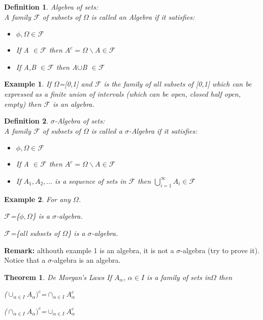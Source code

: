 \documentclass[12pt]{article}
\newtheorem{theorem}{Theorem}
\newtheorem{mydef}{Definition}
\newtheorem{example}{Example}
\begin{document}
\begin{mydef}{Algebra of sets:} \\ A family $\mathcal{F}$ of subsets of $\Omega$ is called an Algebra if it satisfies:
\begin{itemize}
  \item[(i)] $\phi, \Omega \in \mathcal{F}$
  \item[(ii)] If A $\in \mathcal{F}$ then $A^{c}= \Omega \backslash A \in \mathcal{F}$
  \item[(iii)] If A,B $\in \mathcal{F}$ then A$\cup$B $\in \mathcal{F}$
\end{itemize}
 \end{mydef}

\begin{example} If $\Omega$=[0,1] and $\mathcal{F}$ is the family of all subsets of [0,1] which can be expressed as a finite union of intervals (which can be open, closed half open, empty) then $\mathcal{F}$ is an algebra. \end{example}

\begin{mydef}{$\sigma$-Algebra of sets:} \\ A family $\mathcal{F}$ of subsets of $\Omega$ is called a $\sigma$-Algebra if it satisfies:
\begin{itemize}
  \item[(i)] $\phi, \Omega \in \mathcal{F}$
  \item[(ii)] If A $\in \mathcal{F}$ then $A^{c}= \Omega \backslash A \in \mathcal{F}$
  \item[(iii)] If $A_1,A_2,\dots$ is a sequence of sets in $\mathcal{F}$ then $\bigcup_{i=1}^{\infty} A_{i} \in \mathcal{F}$
\end{itemize}
 \end{mydef}

\begin{example} 
For any $\Omega$.
\item $\mathcal{F}$=\{$\phi,\Omega$\} is a $\sigma$-algebra.
\item $\mathcal{F}$=\{all subsets of $\Omega$\} is a $\sigma$-algebra.
\end{example}

{\bf Remark:} althouth example 1 is an algebra, it is not a $\sigma$-algebra (try to prove it). Notice that a $\sigma$-algebra is an algebra. 
\vspace{20pt}
\begin{theorem}{De Morgan's Laws} If $A_{\alpha}$, $\alpha \in I$ is a family of sets in$\Omega$ then
\item ($\cup_{\alpha \in I}A_{\alpha})^{c}$=$\cap_{\alpha \in I}A_{\alpha}^{c}$
\item ($\cap_{\alpha \in I}A_{\alpha})^{c}$=$\cup_{\alpha \in I}A_{\alpha}^{c}$
\end{theorem}
\end{document}
